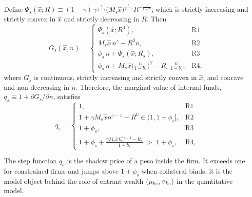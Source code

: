 \documentclass[12pt]{article}
\begin{document}
\begin{lemma}
\label{lem:value}
Define $\Psi_{s}(\hat x;R)\equiv(1-\gamma)\,\gamma^{\frac{\gamma}{1-\gamma}} \big(M_{s}\hat x\big)^{\frac{1}{1-\gamma}}R^{-\frac{\gamma}{1-\gamma}}$, which is strictly increasing and strictly convex in $\hat x$ and strictly decreasing in $R$. Then
\begin{equation}
  G_{s}(\hat x,n)=
  \begin{cases}
    \Psi_{s}(\hat x;R^0), & \text{R1}\\[2pt]
    M_{s}\hat x\,n^{\gamma}-R^0 n, & \text{R2}\\[2pt]
    \phi_{s}\,n+\Psi_{s}(\hat x;R_{s}), & \text{R3}\\[2pt]
    \phi_{s}\,n
      + M_{s}\hat x\Big(\tfrac{n}{1-b_{s}}\Big)^{\gamma}
      - R_{s}\,\tfrac{n}{1-b_{s}}, & \text{R4},
  \end{cases}
  \label{eq:toy-G}
\end{equation}
where $G_{s}$ is continuous, strictly increasing and strictly convex in $\hat x$, and
concave and non-decreasing in $n$. Therefore, the marginal value of internal
funds, $q_{s}\equiv 1+\partial G_{s}/\partial n$, satisfies
\begin{equation}
  q_{s}=
  \begin{cases}
    1, & \text{R1}\\[2pt]
    1+\gamma M_{s}\hat x n^{\gamma-1}-R^0\in(1,1+\phi_{s}], & \text{R2}\\[2pt]
    1+\phi_{s}, & \text{R3}\\[2pt]
    1+\phi_{s}
  +\frac{\gamma M_{s}\hat x\,k^{*\,\gamma-1}_{s}-R_{s}}{1-b_{s}}
  \;>\;1+\phi_{s}, & \text{R4},
  \end{cases}
  \label{eq:toy-q}
\end{equation}
 
The step function $q_{s}$ is the shadow price of a peso inside the firm. It exceeds one for constrained firms and jumps above $1+\phi_{s}$ when collateral binds; it is the model object behind the role of entrant wealth $(\mu_{k_0},\sigma_{k_0})$ in the quantitative model.
\end{lemma}
\end{document}
